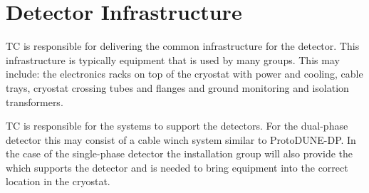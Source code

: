 \section{Detector Infrastructure}
\label{sec:fdsp-coord-infrastructure}

TC is responsible for delivering the common infrastructure for the
detector. This infrastructure is typically equipment that is used by
many groups. This may include: the electronics racks on top of the
cryostat with power and cooling, cable trays, cryostat crossing
tubes and flanges and ground monitoring and isolation transformers.

TC is responsible for the systems to support the detectors. For the
dual-phase detector this may consist of a cable winch system similar
to ProtoDUNE-DP.  In the case of the single-phase detector the
installation group will also provide the  which supports
the detector and is needed to bring equipment into the correct
location in the cryostat.


